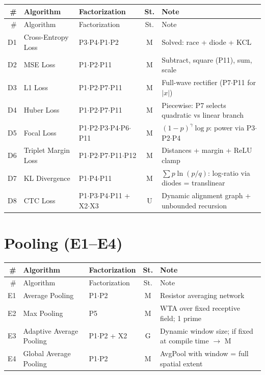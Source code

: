 \documentclass[10pt]{article}
\begin{document}
\begin{longtable}{rlp{3.0cm}cp{4.8cm}}
\toprule
\# & Algorithm & Factorization & St. & Note \\
\midrule
\endfirsthead
\toprule
\# & Algorithm & Factorization & St. & Note \\
\midrule
\endhead
\bottomrule
\endfoot
D1 & Cross-Entropy Loss & P3$\cdot$P4$\cdot$P1$\cdot$P2 & M & Solved: race + diode + KCL \\
D2 & MSE Loss & P1$\cdot$P2$\cdot$P11 & M & Subtract, square (P11), sum, scale \\
D3 & L1 Loss & P1$\cdot$P2$\cdot$P7$\cdot$P11 & M & Full-wave rectifier (P7$\cdot$P11 for $|x|$) \\
D4 & Huber Loss & P1$\cdot$P2$\cdot$P7$\cdot$P11 & M & Piecewise: P7 selects quadratic vs linear branch \\
D5 & Focal Loss & P1$\cdot$P2$\cdot$P3$\cdot$P4$\cdot$P6$\cdot$P11 & M & $(1-p)^\gamma \log p$: power via P3$\cdot$P2$\cdot$P4 \\
D6 & Triplet Margin Loss & P1$\cdot$P2$\cdot$P7$\cdot$P11$\cdot$P12 & M & Distances + margin + ReLU clamp \\
D7 & KL Divergence & P1$\cdot$P4$\cdot$P11 & M & $\sum p \ln(p/q)$: log-ratio via diodes = translinear \\
D8 & CTC Loss & P1$\cdot$P3$\cdot$P4$\cdot$P11 + X2$\cdot$X3 & U & Dynamic alignment graph + unbounded recursion \\
\end{longtable}

\section{Pooling (E1--E4)}

\begin{longtable}{rlp{3.0cm}cp{4.8cm}}
\toprule
\# & Algorithm & Factorization & St. & Note \\
\midrule
\endfirsthead
\toprule
\# & Algorithm & Factorization & St. & Note \\
\midrule
\endhead
\bottomrule
\endfoot
E1 & Average Pooling & P1$\cdot$P2 & M & Resistor averaging network \\
E2 & Max Pooling & P5 & M & WTA over fixed receptive field; 1 prime \\
E3 & Adaptive Average Pooling & P1$\cdot$P2 + X2 & G & Dynamic window size; if fixed at compile time $\to$ M \\
E4 & Global Average Pooling & P1$\cdot$P2 & M & AvgPool with window = full spatial extent \\
\end{longtable}
\end{document}
